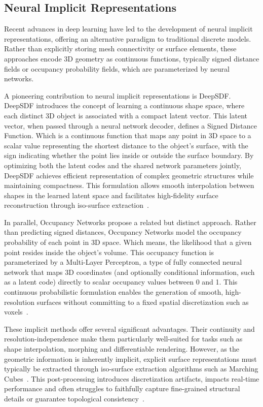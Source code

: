 \subsection{Neural Implicit Representations}

Recent advances in deep learning have led to the development of neural implicit representations, offering an alternative paradigm to traditional discrete models.  
Rather than explicitly storing mesh connectivity or surface elements, these approaches encode 3D geometry as continuous functions, typically signed distance fields or occupancy probability fields, which are parameterized by neural networks.  

A pioneering contribution to neural implicit representations is DeepSDF.  
DeepSDF introduces the concept of learning a continuous shape space, where each distinct 3D object is associated with a compact latent vector.  
This latent vector, when passed through a neural network decoder, defines a Signed Distance Function.  
Which is a continuous function that maps any point in 3D space to a scalar value representing the shortest distance to the object's surface, with the sign indicating whether the point lies inside or outside the surface boundary.  
By optimizing both the latent codes and the shared network parameters jointly, DeepSDF achieves efficient representation of complex geometric structures while maintaining compactness.  
This formulation allows smooth interpolation between shapes in the learned latent space and facilitates high-fidelity surface reconstruction through iso-surface extraction~\cite{park2019}.  

In parallel, Occupancy Networks propose a related but distinct approach.  
Rather than predicting signed distances, Occupancy Networks model the occupancy probability of each point in 3D space.  
Which means, the likelihood that a given point resides inside the object's volume.  
This occupancy function is parameterized by a Multi-Layer Perceptron, a type of fully connected neural network that maps 3D coordinates (and optionally conditional information, such as a latent code) directly to scalar occupancy values between 0 and 1.  
This continuous probabilistic formulation enables the generation of smooth, high-resolution surfaces without committing to a fixed spatial discretization such as voxels~\cite{mescheder2019}.  

These implicit methods offer several significant advantages.  
Their continuity and resolution-independence make them particularly well-suited for tasks such as shape interpolation, morphing and differentiable rendering.  
However, as the geometric information is inherently implicit, explicit surface representations must typically be extracted through iso-surface extraction algorithms such as Marching Cubes~\cite{lorensen1987}.  
This post-processing introduces discretization artifacts, impacts real-time performance and often struggles to faithfully capture fine-grained structural details or guarantee topological consistency~\cite{sitzmann2020}.  

